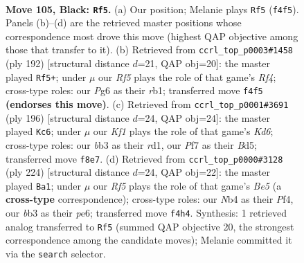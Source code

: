 \documentclass[11pt]{article}
\begin{document}
\clearpage

\begin{figure}[p]\centering
\begin{subfigure}{0.46\textwidth}\centering
\resizebox{\linewidth}{!}{%
\newchessgame
\chessboard[
  setfen={5k2/5p2/6p1/4P3/1n3r2/1B4p1/6K1/8 b - - 1 105},
  showmover=false,
  pgfstyle=straightmove, color=movearrow, markmove={f4-f5}
]}
\caption{}
\end{subfigure}\hfill
\begin{subfigure}{0.46\textwidth}\centering
\resizebox{\linewidth}{!}{%
\newchessgame
\chessboard[
  setfen={8/8/4K3/pPk5/P4R2/8/8/1r6 w - - 91 97},
  showmover=false,
  pgfstyle=straightmove, color=movearrow, markmove={f4-f5}
]}
\caption{}
\end{subfigure}
\\[4pt]
\begin{subfigure}{0.46\textwidth}\centering
\resizebox{\linewidth}{!}{%
\newchessgame
\chessboard[
  setfen={8/b7/P2K2p1/3B2k1/R5P1/8/8/3r4 w - - 42 99},
  showmover=false,
  pgfstyle=straightmove, color=movearrow, markmove={d6-c6}
]}
\caption{}
\end{subfigure}\hfill
\begin{subfigure}{0.46\textwidth}\centering
\resizebox{\linewidth}{!}{%
\newchessgame
\chessboard[
  setfen={4b3/8/4p2k/2P1B2P/5P1K/8/p7/8 w - - 7 113},
  showmover=false,
  pgfstyle=straightmove, color=movearrow, markmove={e5-a1}
]}
\caption{}
\end{subfigure}
\caption{\textbf{Move 105, Black: \texttt{Rf5}.} (a) Our position; Melanie plays \texttt{Rf5} (\texttt{f4f5}). Panels (b)--(d) are the retrieved master positions whose correspondence most drove this move (highest QAP objective among those that transfer to it). (b) Retrieved from \texttt{ccrl\_top\_p0003\#1458} (ply 192) [structural distance $d$=21, QAP obj=20]: the master played \texttt{Rf5+}; under $\mu$ our \emph{Rf5} plays the role of that game's \emph{Rf4}; cross-type roles: our \emph{P}g6 as their \emph{r}b1; transferred move \texttt{f4f5} \textbf{(endorses this move)}. (c) Retrieved from \texttt{ccrl\_top\_p0001\#3691} (ply 196) [structural distance $d$=24, QAP obj=24]: the master played \texttt{Kc6}; under $\mu$ our \emph{Kf1} plays the role of that game's \emph{Kd6}; cross-type roles: our \emph{b}b3 as their \emph{r}d1, our \emph{P}f7 as their \emph{B}d5; transferred move \texttt{f8e7}. (d) Retrieved from \texttt{ccrl\_top\_p0000\#3128} (ply 224) [structural distance $d$=24, QAP obj=22]: the master played \texttt{Ba1}; under $\mu$ our \emph{Rf5} plays the role of that game's \emph{Be5} (a \textbf{cross-type} correspondence); cross-type roles: our \emph{N}b4 as their \emph{P}f4, our \emph{b}b3 as their \emph{p}e6; transferred move \texttt{f4h4}. Synthesis: 1 retrieved analog transferred to \texttt{Rf5} (summed QAP objective 20, the strongest correspondence among the candidate moves); Melanie committed it via the \texttt{search} selector.}
\label{fig:thought-m209}
\end{figure}
\end{document}
